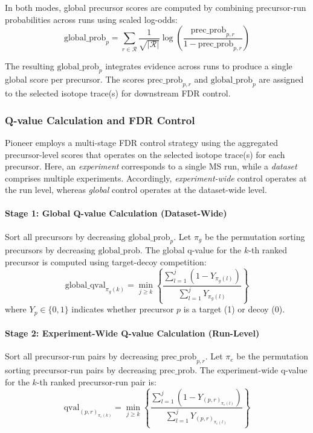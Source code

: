 \documentclass[pdflatex,sn-nature]{sn-jnl}
\begin{document}
In both modes, global precursor scores are computed by combining precursor-run probabilities across runs using scaled log-odds:
\begin{equation}
  \text{global\_prob}_{p} = \sum_{r \in \mathcal{R}} \frac{1}{\sqrt{|\mathcal{R}|}} \log\left(\frac{\text{prec\_prob}_{p,r}}{1 - \text{prec\_prob}_{p,r}}\right)
\end{equation}

The resulting $\text{global\_prob}_p$ integrates evidence across runs to produce a single global score per precursor. The scores $\text{prec\_prob}_{p,r}$ and $\text{global\_prob}_p$ are assigned to the selected isotope trace(s) for downstream FDR control.


\subsubsection{Q-value Calculation and FDR Control}\label{subsubsec:qvalue-calculation-fdr-control}

Pioneer employs a multi-stage FDR control strategy using the aggregated precursor-level scores that operates on the selected isotope trace(s) for each precursor. Here, an \emph{experiment} corresponds to a single MS run, while a \emph{dataset} comprises multiple experiments. Accordingly, \emph{experiment-wide} control operates at the run level, whereas \emph{global} control operates at the dataset-wide level.

\paragraph{Stage 1: Global Q-value Calculation (Dataset-Wide)}\label{para:stage1-global-qvalue-calculation}
Sort all precursors by decreasing $\text{global\_prob}_p$. Let $\pi_g$ be the permutation sorting precursors by decreasing $\text{global\_prob}$. The global q-value for the $k$-th ranked precursor is computed using target-decoy competition:
\begin{equation}
  \text{global\_qval}_{\pi_g(k)} = \min_{j \geq k} \left\{ \frac{\sum_{l=1}^{j} (1 - Y_{\pi_g(l)})}{\sum_{l=1}^{j} Y_{\pi_g(l)}} \right\}
\end{equation}
where $Y_p \in \{0,1\}$ indicates whether precursor $p$ is a target (1) or decoy (0).

\paragraph{Stage 2: Experiment-Wide Q-value Calculation (Run-Level)}\label{para:stage2-experiment-wide-qvalue-calculation}
Sort all precursor-run pairs by decreasing $\text{prec\_prob}_{p,r}$. Let $\pi_e$ be the permutation sorting precursor-run pairs by decreasing $\text{prec\_prob}$. The experiment-wide q-value for the $k$-th ranked precursor-run pair is:
\begin{equation}
  \text{qval}_{(p,r)_{\pi_e(k)}} = \min_{j \geq k} \left\{ \frac{\sum_{l=1}^{j} (1 - Y_{(p,r)_{\pi_e(l)}})}{\sum_{l=1}^{j} Y_{(p,r)_{\pi_e(l)}}} \right\}
\end{equation}
\end{document}
